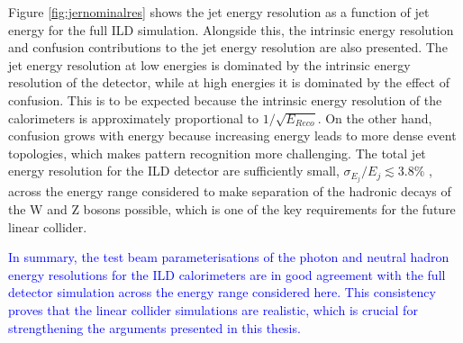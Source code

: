 Figure \ref{fig:jernominalres} shows the jet energy resolution as a function of jet energy for the full ILD simulation.  Alongside this, the intrinsic energy resolution and confusion contributions to the jet energy resolution are also presented.  The jet energy resolution at low energies is dominated by the intrinsic energy resolution of the detector, while at high energies it is dominated by the effect of confusion.  This is to be expected because the intrinsic energy resolution of the calorimeters is approximately proportional to $1 / \sqrt{E_{Reco}}$.  On the other hand, confusion grows with energy because increasing energy leads to more dense event topologies, which makes pattern recognition more challenging.  The total jet energy resolution for the ILD detector are sufficiently small, $\sigma_{E_{j}} / E_{j} \lesssim 3.8\%$ \cite{Behnke:2013lya, arXiv:0907.3577, Linssen:2012hp}, across the energy range considered to make separation of the hadronic decays of the W and Z bosons possible, which is one of the key requirements for the future linear collider.

\textcolor{blue}{In summary, the test beam parameterisations of the photon and neutral hadron energy resolutions for the ILD calorimeters are in good agreement with the full detector simulation across the energy range considered here.  This consistency proves that the linear collider simulations are realistic, which is crucial for strengthening the arguments presented in this thesis.}

